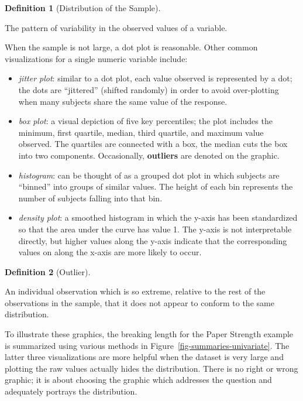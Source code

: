 \documentclass[
  letterpaper,
  DIV=11,
  numbers=noendperiod]{scrreprt}
\providecommand{\tightlist}{%
  \setlength{\itemsep}{0pt}\setlength{\parskip}{0pt}}\usepackage{longtable,booktabs,array}
\theoremstyle{definition}
\newtheorem{definition}{Definition}[chapter]
\theoremstyle{plain}
\theoremstyle{definition}
\theoremstyle{remark}
\begin{document}
\begin{definition}[Distribution of the
Sample]\protect\hypertarget{def-distribution-sample}{}\label{def-distribution-sample}

The pattern of variability in the observed values of a variable.

\end{definition}

When the sample is not large, a dot plot is reasonable. Other common
visualizations for a single numeric variable include:

\begin{itemize}
\tightlist
\item
  \emph{jitter plot}: similar to a dot plot, each value observed is
  represented by a dot; the dots are ``jittered'' (shifted randomly) in
  order to avoid over-plotting when many subjects share the same value
  of the response.
\item
  \emph{box plot}: a visual depiction of five key percentiles; the plot
  includes the minimum, first quartile, median, third quartile, and
  maximum value observed. The quartiles are connected with a box, the
  median cuts the box into two components. Occasionally,
  \textbf{outliers} are denoted on the graphic.
\item
  \emph{histogram}: can be thought of as a grouped dot plot in which
  subjects are ``binned'' into groups of similar values. The height of
  each bin represents the number of subjects falling into that bin.
\item
  \emph{density plot}: a smoothed histogram in which the y-axis has been
  standardized so that the area under the curve has value 1. The y-axis
  is not interpretable directly, but higher values along the y-axis
  indicate that the corresponding values on along the x-axis are more
  likely to occur.
\end{itemize}

\begin{definition}[Outlier]\protect\hypertarget{def-outlier}{}\label{def-outlier}

An individual observation which is so extreme, relative to the rest of
the observations in the sample, that it does not appear to conform to
the same distribution.

\end{definition}

To illustrate these graphics, the breaking length for the Paper Strength
example is summarized using various methods in
Figure~\ref{fig-summaries-univariate}. The latter three visualizations
are more helpful when the dataset is very large and plotting the raw
values actually hides the distribution. There is no right or wrong
graphic; it is about choosing the graphic which addresses the question
and adequately portrays the distribution.
\end{document}
